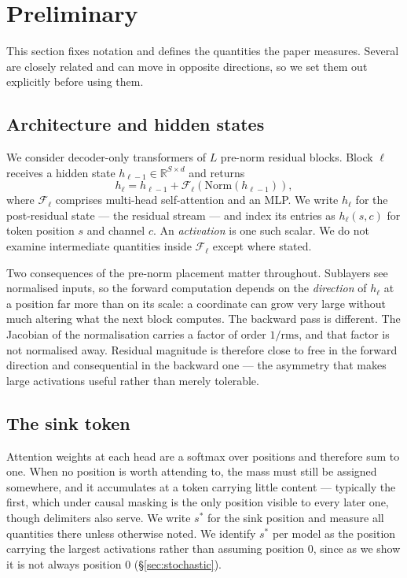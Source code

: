 \documentclass[11pt]{article}
\newcommand{\rms}{\mathrm{rms}}
\begin{document}
\section{Preliminary}\label{sec:prelim}

This section fixes notation and defines the quantities the paper measures. Several
are closely related and can move in opposite directions, so we set them out
explicitly before using them.

\subsection{Architecture and hidden states}

We consider decoder-only transformers of $L$ pre-norm residual blocks. Block $\ell$
receives a hidden state $h_{\ell-1}\in\mathbb{R}^{S\times d}$ and returns
\begin{equation}
h_\ell = h_{\ell-1} + \mathcal{F}_\ell\!\left(\mathrm{Norm}(h_{\ell-1})\right),
\end{equation}
where $\mathcal{F}_\ell$ comprises multi-head self-attention and an MLP. We write
$h_\ell$ for the post-residual state --- the residual stream --- and index its
entries as $h_\ell(s,c)$ for token position $s$ and channel $c$. An
\emph{activation} is one such scalar. We do not examine intermediate quantities
inside $\mathcal{F}_\ell$ except where stated.

Two consequences of the pre-norm placement matter throughout. Sublayers see
normalised inputs, so the forward computation depends on the \emph{direction} of
$h_\ell$ at a position far more than on its scale: a coordinate can grow very large
without much altering what the next block computes. The backward pass is different.
The Jacobian of the normalisation carries a factor of order $1/\rms$, and that
factor is not normalised away. Residual magnitude is therefore close to free in the
forward direction and consequential in the backward one --- the asymmetry that makes
large activations useful rather than merely tolerable.

\subsection{The sink token}

Attention weights at each head are a softmax over positions and therefore sum to
one. When no position is worth attending to, the mass must still be assigned
somewhere, and it accumulates at a token carrying little content --- typically the
first, which under causal masking is the only position visible to every later one,
though delimiters also serve. We write $s^\ast$ for the sink position and measure
all quantities there unless otherwise noted. We identify $s^\ast$ per model as the
position carrying the largest activations rather than assuming position $0$, since
as we show it is not always position $0$ (\S\ref{sec:stochastic}).
\end{document}
